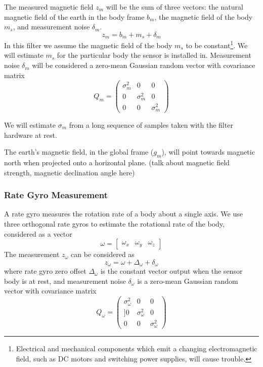 \documentclass[12pt]{report}
\begin{document}
The measured magnetic field $z_m$ will be the sum of three vectors: the natural magnetic field of the earth in the body frame $b_m$, the magnetic field of the body $m_s$, and measurement noise $\delta_m$.
\begin{equation} \label{eq:zm}
  z_m = b_m + m_s + \delta_m
\end{equation}
In this filter we assume the magnetic field of the body $m_s$ to be constant\footnote{Electrical and mechanical components which emit a changing electromagnetic field, such as DC motors and switching power supplies, will cause trouble.}. We will estimate $m_s$ for the particular body the sensor is installed in. Measurement noise $\delta_m$ will be considered a zero-mean Gaussian random vector with covariance matrix
\begin{equation} \label{eq:Qm}
  Q_m = \begin{pmatrix} \sigma_m^2 & 0 & 0 \\
	                      0 & \sigma_m^2 & 0 \\ 
	                      0 & 0 & \sigma_m^2 \end{pmatrix} 
\end{equation}

We will estimate $\sigma_m$ from a long sequence of samples taken with the filter hardware at rest.

The earth's magnetic field, in the global frame ($g_m$), will point towards magnetic north when projected onto a horizontal plane. (talk about magnetic field strength, magnetic declination angle here)


\subsubsection{Rate Gyro Measurement}

A rate gyro measures the rotation rate of a body about a single axis. We use three orthogonal rate gyros to estimate the rotational rate of the body, considered as a vector
\begin{equation} \label{eq:omega}
	\omega = \begin{bmatrix} \omega_x & \omega_y & \omega_z \end{bmatrix}
\end{equation}
The measurement $z_\omega$ can be considered as
\begin{equation} \label{eq:zomega}
	z_\omega = \omega + \Delta_\omega + \delta_\omega
\end{equation}
where rate gyro zero offset $\Delta_\omega$ is the constant vector output when the sensor body is at rest,
and measurement noise $\delta_\omega$ is a zero-mean Gaussian random vector with covariance matrix
\begin{equation} \label{eq:Qomega}
	Q_\omega = \begin{pmatrix} \sigma_\omega^2 & 0 & 0 \\
	                  ]    0 & \sigma_\omega^2 & 0 \\ 
	                      0 & 0 & \sigma_\omega^2 \end{pmatrix} 
\end{equation}
\end{document}
